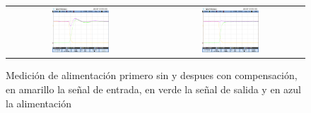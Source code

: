 \begin{figure}[H]
    \centering
    \begin{tabular}{c c}
        \includegraphics[width=0.4\textwidth]{ImagenesEjercicio4/overshoot.png} &
        \includegraphics[width=0.4\textwidth]{ImagenesEjercicio4/overshoot_c.png}
    \end{tabular}
    \caption{Medición de alimentación primero sin y despues con compensación, en amarillo la señal de entrada, en verde la señal de salida y en azul la alimentación}
    
\end{figure}



